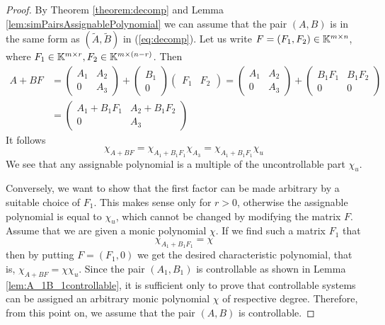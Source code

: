 \begin{proof}
    By Theorem \ref{theorem:decomp} and Lemma \ref{lem:simPairsAssignablePolynomial} we can assume that the pair $(A,B)$ is in the same form as $(\widetilde{A},\widetilde{B})$ in (\ref{eq:decomp}). Let us write $F=(F_1,F_2)\in\mathbb{K}^{m\times n}$, where $F_1\in\mathbb{K}^{m\times r}, F_2\in\mathbb{K}^{m\times (n-r)}$. Then 
    \begin{align*}
        A+BF&=
        \begin{pmatrix}
            A_1 & A_2 \\
            0   & A_3
        \end{pmatrix}
        +
        \begin{pmatrix}
            B_1 \\
            0
        \end{pmatrix}
        \begin{pmatrix}
            F_1 & F_2
        \end{pmatrix}
        =
        \begin{pmatrix}
            A_1 & A_2 \\
            0   & A_3
        \end{pmatrix}
        +
        \begin{pmatrix}
            B_1F_1 & B_1F_2 \\
            0 & 0
        \end{pmatrix}
        \\
        &=
        \begin{pmatrix}
            A_1+B_1F_1 & A_2+B_1F_2 \\
            0 & A_3
        \end{pmatrix}
    \end{align*}
    It follows 
    $$\chi_{A+BF}=\chi_{A_1+B_1F_1}\chi_{A_3}=\chi_{A_1+B_1F_1}\chi_u$$
    We see that any assignable polynomial is a multiple of the uncontrollable part $\chi_u$.

    Conversely, we want to show that the first factor can be made arbitrary by a suitable choice of $F_1$. This makes sense only for $r>0$, otherwise the assignable polynomial is equal to $\chi_u$, which cannot be changed by modifying the matrix $F$. Assume that we are given a monic polynomial $\chi$. If we find such a matrix $F_1$ that 
    $$\chi_{A_1+B_1F_1}=\chi$$
    then by putting $F=(F_1,0)$ we get the desired characteristic polynomial, that is, $\chi_{A+BF}=\chi\chi_u$. Since the pair $(A_1,B_1)$ is controllable as shown in Lemma \ref{lem:A_1B_1controllable}, it is sufficient only to prove that controllable systems can be assigned an arbitrary monic polynomial $\chi$ of respective degree. Therefore, from this point on, we assume that the pair $(A,B)$ is controllable.


\end{proof}
